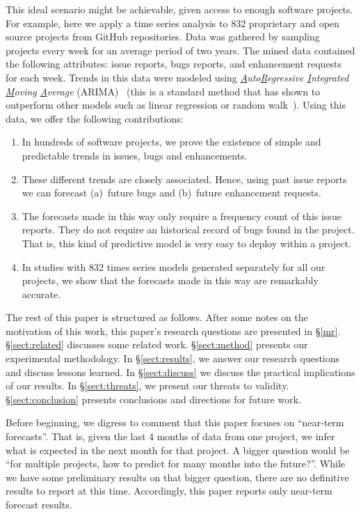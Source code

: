 \documentclass[sigconf, preprint]{acmart}
\newcommand{\be}{\begin{enumerate}}
\newcommand{\ee}{\end{enumerate}}
\newcommand{\tion}[1]{\S\ref{sect:#1}}
\begin{document}
This  ideal scenario might be achievable, given access
to enough   software projects.
For example, here we apply a  time series analysis to   832 proprietary and 
open source projects from GitHub repositories.  Data was gathered by sampling projects every week for an 
average period of two years. The mined data contained the following attributes: issue reports, bugs reports, and enhancement requests for each week. Trends in this data were
modeled using
\textit{\underline{A}uto\underline{R}egressive \underline{I}ntegrated
\underline{M}oving 
\underline{A}verage} (ARIMA)~\cite{box2015time}
(this is a standard method that has shown to  outperform other models 
such as linear regression or random walk~\cite{kenmei2008trend, ho1998use, pai2006software, amin2013approach, 
burtschy1997improving}). 
Using this data, we offer the following contributions:
\be
\item In hundreds of software projects, we prove the existence of  simple and predictable trends in issues, bugs and enhancements.
\item These different trends are closely associated. Hence, using past issue reports we can forecast (a)~future bugs and (b)~future enhancement requests.
\item
The forecasts made in this way only require  a frequency count of this issue reports. They do not require an historical record of bugs found in the project. That is, this kind of predictive model is very easy to deploy within a project.
\item
In studies with 832 times series models generated separately for all our projects, we show that the
 forecasts made in this way are remarkably accurate.
\ee
The rest of this paper is structured as follows. 
 After some notes on the    motivation of this work, this paper's   research questions are presented  in \S\ref{mr}.   \tion{related}  discusses some   related work.   \tion{method} presents our experimental methodology. In 
\tion{results}, we answer our research questions and discuss  lessons learned. In \tion{discuss} we discuss the practical implications of our results. In \tion{threats}, we present our threats to validity.  
 \tion{conclusion} presents   conclusions and directions for future work.

Before beginning, we digress to comment that this paper focuses on ``near-term forecasts''.
That is,    given the last 4 months of data from one project, we infer what is expected in the next month for that project. A bigger question would be ``for multiple projects, how to predict for many months into the future?''. While we have some  preliminary results on that bigger question, there are no definitive results to report at this time.  Accordingly, this paper reports
only near-term forecast results.
\end{document}
